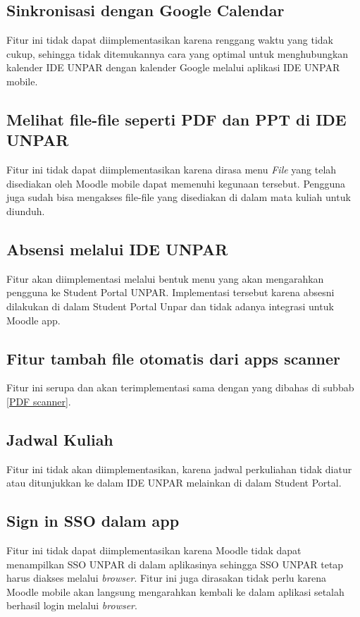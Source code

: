 \subsection{Sinkronisasi dengan Google Calendar}
Fitur ini tidak dapat diimplementasikan karena renggang waktu yang tidak cukup, sehingga tidak ditemukannya cara yang optimal untuk menghubungkan kalender IDE UNPAR dengan kalender Google melalui aplikasi IDE UNPAR mobile.

\subsection{Melihat file-file seperti PDF dan PPT di IDE UNPAR}
Fitur ini tidak dapat diimplementasikan karena dirasa menu \textit{File} yang telah disediakan oleh Moodle mobile dapat memenuhi kegunaan tersebut. Pengguna juga sudah bisa mengakses file-file yang disediakan di dalam mata kuliah untuk diunduh.

\subsection{Absensi melalui IDE UNPAR} 
\label{absesnsi IDE}
Fitur akan diimplementasi  melalui bentuk menu yang akan mengarahkan pengguna ke Student Portal UNPAR. Implementasi tersebut karena absesni dilakukan di dalam Student Portal Unpar dan tidak adanya integrasi untuk Moodle app.

\subsection{Fitur tambah file otomatis dari apps scanner}
\label{scanner app}
Fitur ini serupa dan akan terimplementasi sama dengan yang dibahas di subbab \ref{PDF scanner}.

\subsection{Jadwal Kuliah}
Fitur ini tidak akan diimplementasikan, karena jadwal perkuliahan tidak diatur atau ditunjukkan ke dalam IDE UNPAR melainkan di dalam Student Portal.

\subsection{Sign in SSO dalam app}
\label{in app sign in}
Fitur ini tidak dapat diimplementasikan karena Moodle tidak dapat menampilkan SSO UNPAR di dalam aplikasinya sehingga SSO UNPAR tetap harus diakses melalui \textit{browser}. Fitur ini juga dirasakan tidak perlu karena Moodle mobile akan langsung mengarahkan kembali ke dalam aplikasi setalah berhasil login melalui \textit{browser}.

